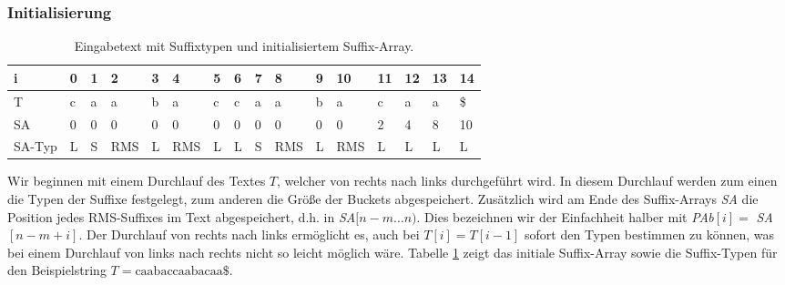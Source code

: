 \subsubsection{Initialisierung}


\begin{table}
	\centering
	\resizebox{\columnwidth}{!} {%
		\begin{tabular}{l|l|l|l|l|l|l|l|l|l|l|l|l|l|l|l}
			i      & 0 & 1 & 2   & 3 & 4   & 5 & 6 & 7 & 8   & 9 & 10  & 11 & 12 & 13 & 14 \\ \hline
			T      & c & a & a   & b & a   & c & c & a & a   & b & a   & c  & a  & a  & \$ \\ \hline
			SA     & 0 & 0 & 0   & 0 & 0   & 0 & 0 & 0 & 0   & 0 & 0   & \cellcolor[HTML]{32CB00}2  & \cellcolor[HTML]{32CB00}4  & \cellcolor[HTML]{32CB00}8  & \cellcolor[HTML]{32CB00}10 \\ \hline
			SA-Typ & L & S & RMS & L & RMS & L & L & S & RMS & L & RMS & L  & L  & L  & L 
		\end{tabular}%
	}
	\caption{Eingabetext mit Suffixtypen und initialisiertem Suffix-Array.}
	\label{table:sa-init}
\end{table}





Wir beginnen mit einem Durchlauf des Textes $T$, welcher von rechts nach links durchgeführt wird. In diesem Durchlauf werden zum einen die Typen der Suffixe festgelegt, zum anderen die Größe der Buckets abgespeichert. Zusätzlich wird am Ende des Suffix-Arrays \textit{SA} die Position jedes RMS-Suffixes im Text abgespeichert, d.h. in \textit{SA}$[n-m\dots n)$. Dies bezeichnen wir der Einfachheit halber mit \textit{PAb}$[i] = $ \textit{SA}$[n-m+i]$. Der Durchlauf von rechts nach links ermöglicht es, auch bei $T[i] = T[i-1]$ sofort den Typen bestimmen zu können, was bei einem Durchlauf von links nach rechts nicht so leicht möglich wäre. Tabelle \ref{table:sa-init} zeigt das initiale Suffix-Array sowie die Suffix-Typen für den Beispielstring $ T = \text{caabaccaabacaa\$}$.



